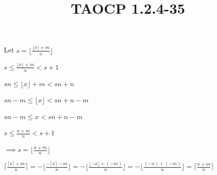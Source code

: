 \documentclass{article}
\title{TAOCP 1.2.4\mbox{-}35}
\begin{document}
\maketitle

Let \( s = \lfloor \frac{\lfloor x \rfloor +m}{n} \rfloor \)

\( s \leq \frac{\lfloor x \rfloor +m}{n} < s + 1 \)

\( sn \leq \lfloor x \rfloor + m < sn+n \)

\( sn - m \leq \lfloor x \rfloor < sn + n - m \)

\( sn - m \leq x < sn + n - m \)

\( s \leq \frac{x+m}{n} < s + 1 \)

\( \implies s = \lfloor \frac{x+m}{n} \rfloor \)

\( \lceil \frac{\lceil x \rceil + m}{n} \rceil = -\lfloor \frac{-\lceil x \rceil - m}{n} \rfloor = -\lfloor \frac{\lfloor -x \rfloor + (- m)}{n} \rfloor = -\lfloor \frac{(-x) + (- m)}{n} \rfloor = \lceil \frac{x + m}{n} \rceil \)
\end{document}
